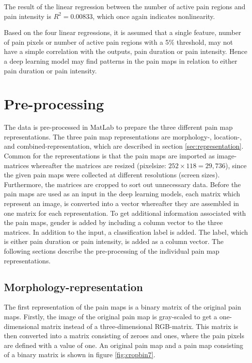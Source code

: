 \noindent
The result of the linear regression between the number of active pain regions and pain intensity is $R^2=0.00833$, which once again indicates nonlinearity. 

\noindent
Based on the four linear regressions, it is assumed that a single feature, number of pain pixels or number of active pain regions with a 5\% threshold, may not have a simple correlation with the outputs, pain duration or pain intensity. Hence a deep learning model may find patterns in the pain maps in relation to either pain duration or pain intensity.\newpage


\section{Pre-processing} \label{sec:prepros}
The data is pre-processed in MatLab to prepare the three different pain map representations. The three pain map representations are morphology-, location-, and combined-representation, which are described in section \ref{sec:representation}. Common for the representations is that the pain maps are imported as image-matrices whereafter the matrices are resized (pixelsize: $252 \times 118 = 29,736$), since the given pain maps were collected at different resolutions (screen sizes). Furthermore, the matrices are cropped to sort out unnecessary data.
Before the pain maps are used as an input in the deep learning models, each matrix which represent an image, is converted into a vector whereafter they are assembled in one matrix for each representation. To get additional information associated with the pain maps, gender is added by including a column vector to the three matrices.
In addition to the input, a classification label is added. The label, which is either pain duration or pain intensity, is added as a column vector.
The following sections describe the pre-processing of the individual pain map representations.

\subsection{Morphology-representation} \label{sec:Morph}
The first representation of the pain maps is a binary matrix of the original pain maps.
Firstly, the image of the original pain map is gray-scaled to get a one-dimensional matrix instead of a three-dimensional RGB-matrix. This matrix is then converted into a matrix consisting of zeroes and ones, where the pain pixels are defined with a value of one. An original pain map and a pain map consisting of a binary matrix is shown in figure \ref{fig:cropbin7}.

